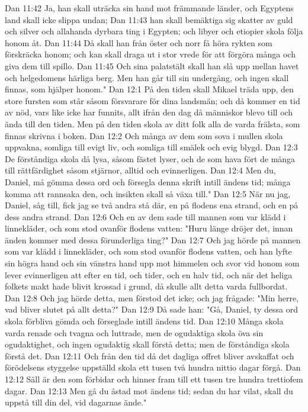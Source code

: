 Dan 11:42  Ja, han skall uträcka sin hand mot främmande länder, och Egyptens land skall icke slippa undan;
Dan 11:43  han skall bemäktiga sig skatter av guld och silver och allahanda dyrbara ting i Egypten; och libyer och etiopier skola följa honom åt.
Dan 11:44  Då skall han från öster och norr få höra rykten som förskräcka honom; och kan skall draga ut i stor vrede för att förgöra många och giva dem till spillo.
Dan 11:45  Och sina palatstält skall han slå upp mellan havet och helgedomens härliga berg. Men han går till sin undergång, och ingen skall finnas, som hjälper honom."
Dan 12:1  På den tiden skall Mikael träda upp, den store fursten som står såsom försvarare för dina landsmän; och då kommer en tid av nöd, vars like icke har funnits, allt ifrån den dag då människor blevo till och ända till den tiden. Men på den tiden skola av ditt folk alla de varda frälsta, som finnas skrivna i boken.
Dan 12:2  Och många av dem som sova i mullen skola uppvakna, somliga till evigt liv, och somliga till smälek och evig blygd.
Dan 12:3  De förståndiga skola då lysa, såsom fästet lyser, och de som hava fört de många till rättfärdighet såsom stjärnor, alltid och evinnerligen.
Dan 12:4  Men du, Daniel, må gömma dessa ord och försegla denna skrift intill ändens tid; många komma att rannsaka den, och insikten skall så växa till."
Dan 12:5  När nu jag, Daniel, såg till, fick jag se två andra stå där, en på flodens ena strand, och en på dess andra strand.
Dan 12:6  Och en av dem sade till mannen som var klädd i linnekläder, och som stod ovanför flodens vatten: "Huru länge dröjer det, innan änden kommer med dessa förunderliga ting?"
Dan 12:7  Och jag hörde på mannen som var klädd i linnekläder, och som stod ovanför flodens vatten, och han lyfte sin högra hand och sin vänstra hand upp mot himmelen och svor vid honom som lever evinnerligen att efter en tid, och tider, och en halv tid, och när det heliga folkets makt hade blivit krossad i grund, då skulle allt detta varda fullbordat.
Dan 12:8  Och jag hörde detta, men förstod det icke; och jag frågade: "Min herre, vad bliver slutet på allt detta?"
Dan 12:9  Då sade han: "Gå, Daniel, ty dessa ord skola förbliva gömda och förseglade intill ändens tid.
Dan 12:10  Många skola varda renade och tvagna och luttrade, men de ogudaktiga skola öva sin ogudaktighet, och ingen ogudaktig skall förstå detta; men de förståndiga skola förstå det.
Dan 12:11  Och från den tid då det dagliga offret bliver avskaffat och förödelsens styggelse uppställd skola ett tusen två hundra nittio dagar förgå.
Dan 12:12  Säll är den som förbidar och hinner fram till ett tusen tre hundra trettiofem dagar.
Dan 12:13  Men gå du åstad mot ändens tid; sedan du har vilat, skall du uppstå till din del, vid dagarnas ände."


